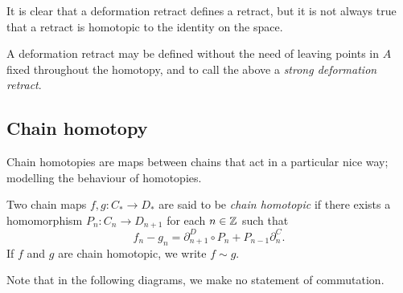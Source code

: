 It is clear that a deformation retract defines a retract, but it is not always true that a retract is homotopic to the identity on the space.

\begin{remark}
	A deformation retract may be defined without the need of leaving points in $A$ fixed throughout the homotopy, and to call the above a \emph{strong deformation retract}.
\end{remark}

\subsection{Chain homotopy}

Chain homotopies are maps between chains that act in a particular nice way; modelling the behaviour of homotopies.

\begin{definition}
	Two chain maps $f,g: C_* \to D_*$ are said to be \emph{chain homotopic} if there exists a homomorphism $P_n: C_n \to D_{n+1}$ for each $n \in \mathbb{Z}$ such that
	\[f_n - g_n = \partial^D_{n+1}\circ P_n + P_{n-1} \partial^C_n.\]
	If $f$ and $g$ are chain homotopic, we write $f \sim g$.
\end{definition}

Note that in the following diagrams, we make no statement of commutation.

